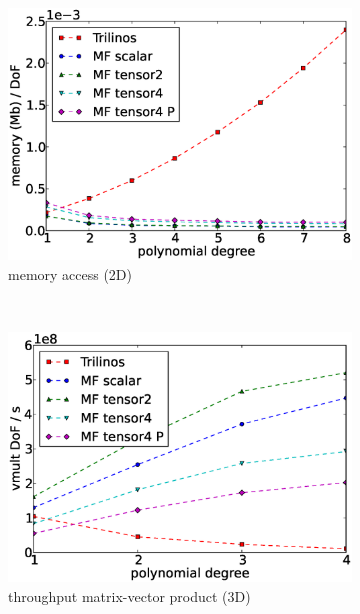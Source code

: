 \documentclass[AMA,STIX1COL]{WileyNJD-v2}
\begin{document}
\begin{figure}
\begin{subfigure}[b]{0.32\textwidth}
      \includegraphics[width=\textwidth]{CSL_Munich_memory2d.eps}
      \caption{memory access (2D)}
      \label{fig:benchmark_miehe_CSL_memory2}
  \end{subfigure}
  ~
  \begin{subfigure}[b]{0.32\textwidth}
    \centering
    \includegraphics[width=\textwidth]{CSL_Munich_throughput3d.eps}
    \caption{throughput matrix-vector product (3D)}
  \end{subfigure}
  \begin{subfigure}[b]{0.32\textwidth}
    \centering

\end{subfigure}
\end{figure}
\end{document}
